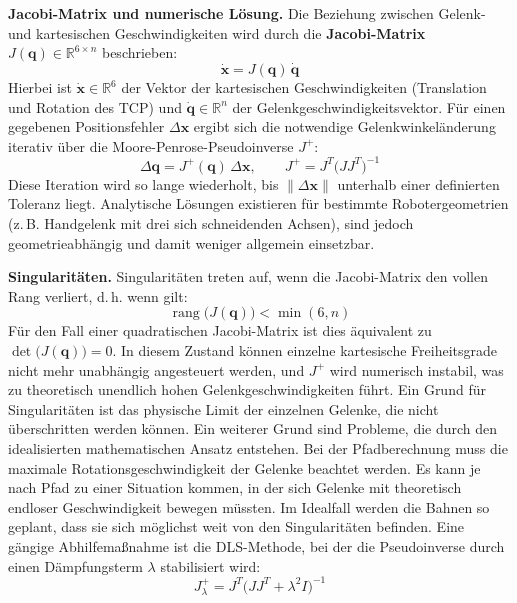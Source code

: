         \textbf{Jacobi-Matrix und numerische Lösung.}
        Die Beziehung zwischen Gelenk- und kartesischen Geschwindigkeiten wird durch die \textbf{Jacobi-Matrix}
        $J(\mathbf{q}) \in \mathbb{R}^{6 \times n}$ beschrieben:
        \begin{equation}
            \dot{\mathbf{x}} = J(\mathbf{q})\,\dot{\mathbf{q}}
            \label{eq:jacobian}
        \end{equation}
        Hierbei ist $\dot{\mathbf{x}} \in \mathbb{R}^6$ der Vektor der kartesischen Geschwindigkeiten (Translation und Rotation des \ac{TCP})
        und $\dot{\mathbf{q}} \in \mathbb{R}^n$ der Gelenkgeschwindigkeitsvektor.
        Für einen gegebenen Positionsfehler $\Delta\mathbf{x}$ ergibt sich die notwendige Gelenkwinkeländerung iterativ über
        die Moore-Penrose-Pseudoinverse $J^+$:
        \begin{equation}
            \Delta\mathbf{q} = J^+(\mathbf{q})\,\Delta\mathbf{x},
            \qquad J^+ = J^T\bigl(J J^T\bigr)^{-1}
            \label{eq:pseudoinverse}
        \end{equation}
        Diese Iteration wird so lange wiederholt, bis $\|\Delta\mathbf{x}\|$ unterhalb einer definierten Toleranz liegt.
        Analytische Lösungen existieren für bestimmte Robotergeometrien (z.\,B. Handgelenk mit drei sich schneidenden Achsen),
        sind jedoch geometrieabhängig und damit weniger allgemein einsetzbar.

        \textbf{Singularitäten.}
        Singularitäten treten auf, wenn die Jacobi-Matrix den vollen Rang verliert, d.\,h. wenn gilt:
        \begin{equation}
            \operatorname{rang}\bigl(J(\mathbf{q})\bigr) < \min(6,n)
            \label{eq:singularity}
        \end{equation}
        Für den Fall einer quadratischen Jacobi-Matrix ist dies äquivalent zu $\det\bigl(J(\mathbf{q})\bigr) = 0$.
        In diesem Zustand können einzelne kartesische Freiheitsgrade nicht mehr unabhängig angesteuert werden,
        und $J^+$ wird numerisch instabil, was zu theoretisch unendlich hohen Gelenkgeschwindigkeiten führt.
        Ein Grund für Singularitäten ist das physische Limit der einzelnen Gelenke, die nicht überschritten werden können.
        Ein weiterer Grund sind Probleme, die durch den idealisierten mathematischen Ansatz entstehen.
        Bei der Pfadberechnung muss die maximale Rotationsgeschwindigkeit der Gelenke beachtet werden.
        Es kann je nach Pfad zu einer Situation kommen, in der sich Gelenke mit theoretisch endloser Geschwindigkeit bewegen müssten.
        Im Idealfall werden die Bahnen so geplant, dass sie sich möglichst weit von den Singularitäten befinden.
        Eine gängige Abhilfemaßnahme ist die \ac{DLS}-Methode, bei der die Pseudoinverse durch einen Dämpfungsterm $\lambda$ stabilisiert wird:
        \begin{equation}
            J^+_\lambda = J^T\bigl(J J^T + \lambda^2 I\bigr)^{-1}
            \label{eq:dls}
        \end{equation}
        \cite{wamplerManipulatorInverseKinematic1986}
        \cite{aristidouInverseKinematicsTechniques2018}


